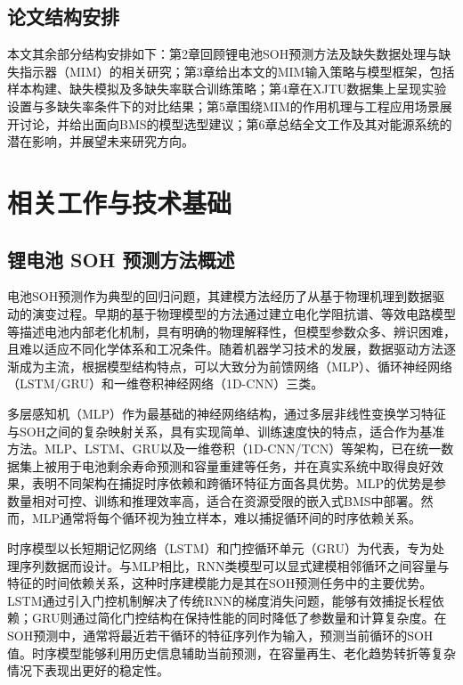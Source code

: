 \documentclass[10pt,a4paper]{ctexart}
\begin{document}
\subsection{论文结构安排}

本文其余部分结构安排如下：第2章回顾锂电池SOH预测方法及缺失数据处理与缺失指示器（MIM）的相关研究；第3章给出本文的MIM输入策略与模型框架，包括样本构建、缺失模拟及多缺失率联合训练策略；第4章在XJTU数据集上呈现实验设置与多缺失率条件下的对比结果；第5章围绕MIM的作用机理与工程应用场景展开讨论，并给出面向BMS的模型选型建议；第6章总结全文工作及其对能源系统的潜在影响，并展望未来研究方向。

\section{相关工作与技术基础}\label{sec:related}

\subsection{锂电池 SOH 预测方法概述}

电池SOH预测作为典型的回归问题，其建模方法经历了从基于物理机理到数据驱动的演变过程\cite{liu2025deep}。早期的基于物理模型的方法通过建立电化学阻抗谱、等效电路模型等描述电池内部老化机制，具有明确的物理解释性，但模型参数众多、辨识困难，且难以适应不同化学体系和工况条件。随着机器学习技术的发展，数据驱动方法逐渐成为主流\cite{liu2025deep}，根据模型结构特点，可以大致分为前馈网络（MLP）、循环神经网络（LSTM/GRU）和一维卷积神经网络（1D-CNN）三类。

多层感知机（MLP）作为最基础的神经网络结构，通过多层非线性变换学习特征与SOH之间的复杂映射关系，具有实现简单、训练速度快的特点，适合作为基准方法\cite{bairwa2025cycle}。MLP、LSTM、GRU以及一维卷积（1D-CNN/TCN）等架构，已在统一数据集上被用于电池剩余寿命预测和容量重建等任务，并在真实系统中取得良好效果\cite{bairwa2025cycle}，表明不同架构在捕捉时序依赖和跨循环特征方面各具优势。MLP的优势是参数量相对可控、训练和推理效率高，适合在资源受限的嵌入式BMS中部署。然而，MLP通常将每个循环视为独立样本，难以捕捉循环间的时序依赖关系。

时序模型以长短期记忆网络（LSTM）和门控循环单元（GRU）为代表，专为处理序列数据而设计\cite{bairwa2025cycle}。与MLP相比，RNN类模型可以显式建模相邻循环之间容量与特征的时间依赖关系，这种时序建模能力是其在SOH预测任务中的主要优势。LSTM通过引入门控机制解决了传统RNN的梯度消失问题，能够有效捕捉长程依赖；GRU则通过简化门控结构在保持性能的同时降低了参数量和计算复杂度。在SOH预测中，通常将最近若干循环的特征序列作为输入，预测当前循环的SOH值。时序模型能够利用历史信息辅助当前预测，在容量再生、老化趋势转折等复杂情况下表现出更好的稳定性。
\end{document}
